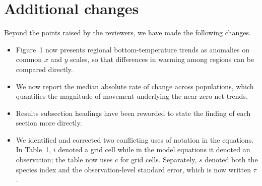 \documentclass[11pt]{article}
\begin{document}
\section*{Additional changes}
Beyond the points raised by the reviewers, we have made the following changes.
\begin{itemize}
\item Figure~1 now presents regional bottom-temperature trends as anomalies on common $x$ and $y$ scales, so that differences in warming among regions can be compared directly.
\item We now report the median absolute rate of change across populations, which quantifies the magnitude of movement underlying the near-zero net trends.
\item Results subsection headings have been reworded to state the finding of each section more directly.
\item We identified and corrected two conflicting uses of notation in the equations. In Table~1, $i$ denoted a grid cell while in the model equations it denoted an observation; the table now uses $c$ for grid cells. Separately, $s$ denoted both the species index and the observation-level standard error, which is now written $\tau$.
\end{itemize}
\end{document}
